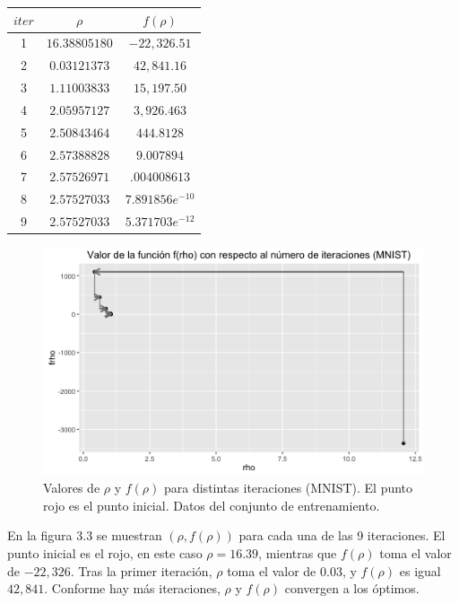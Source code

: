 \begin{center}
\begin{tabular}{ | c | c|  c |} 
\hline
$iter$ & $\rho$ & $f(\rho)$  \\ 
\hline
\hline
1 & $16.38805180$ & $-22,326.51$  \\ 
\hline
2 & $0.03121373$ & $42,841.16$  \\ 
\hline
3 & $1.11003833$ & $15,197.50$  \\ 
\hline
4 & $2.05957127$ & $3,926.463$  \\ 
\hline
5 & $2.50843464$ & $444.8128$  \\ 
\hline
6 & $2.57388828$ & $9.007894$  \\ 
\hline
7 & $2.57526971$ & $.004008613$  \\ 
\hline
8 & $2.57527033$ & $7.891856e^{-10}$  \\ 
\hline
9 & $2.57527033$ & $5.371703e^{-12}$  \\ 
\hline
\hline

\end{tabular}
\end{center}

\begin{figure}[!ht] \label{fig5.3}
  \centering
	\includegraphics[width=.75\textwidth]{Figures/Chapter4_Iteraciones.png}	
  \caption[Valores de $\rho$ y $f(\rho)$ para distintas iteraciones (MNIST).] 
  {Valores de $\rho$ y $f(\rho)$ para distintas iteraciones (MNIST). El punto rojo es el punto inicial. Datos del conjunto de entrenamiento.}
\end{figure}

En la figura 3.3 se muestran $(\rho, f(\rho))$ para cada una de las 9 iteraciones. El punto inicial es el rojo, en este caso $\rho = 16.39$, mientras que $f(\rho)$ toma el valor de $-22,326$. Tras la primer iteración, $\rho$ toma el valor de $0.03$, y $f(\rho)$ es igual $42,841$. Conforme hay más iteraciones, $\rho$ y $f(\rho)$ convergen a los óptimos.

